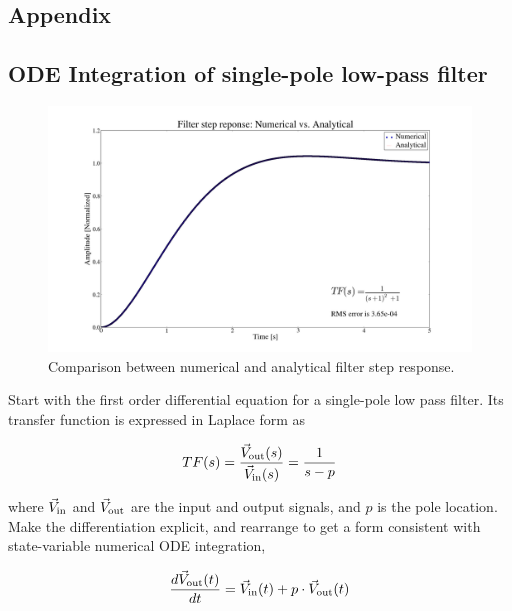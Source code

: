 \documentclass[a4paper,12pt]{article}
\begin{document}
\begin{appendix}

\section{Appendix}

\subsection{ODE Integration of single-pole low-pass filter}
\label{App:ODE_integration}

\begin{figure}
\centering
\includegraphics[scale=0.265]{../figures/filter_step_response.png}
\caption{Comparison between numerical and analytical filter step response.}
\label{fig:filter_step_response}
\end{figure}

Start with the first order differential equation for a single-pole low pass filter. Its transfer function is expressed in Laplace form as

\begin{equation}
 TF(s)=\frac{\vec V_{\rm out}(s)}{\vec V_{\rm in}(s)} = \frac{1}{s-p}
\end{equation}

\noindent where $\vec V_{\rm in}$ and $\vec V_{\rm out}$ are the input and output signals, and $p$ is the pole location. Make the differentiation explicit, and rearrange to get a form consistent with state-variable numerical ODE integration,

\begin{equation}
 \frac{d\vec V_{\rm out}(t)}{dt} = \vec V_{\rm in}(t) + p\cdot \vec V_{\rm out}(t)
\label{eq:exp_diff}
\end{equation}


\end{appendix}
\end{document}
